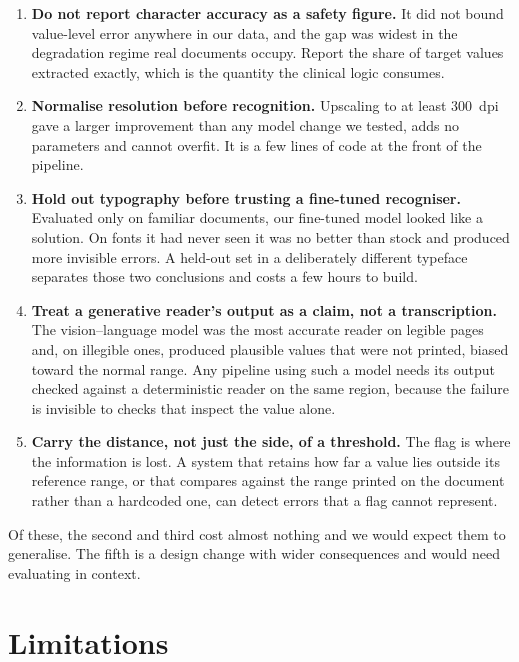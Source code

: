 \documentclass[11pt]{article}
\begin{document}
\begin{enumerate}
\item \textbf{Do not report character accuracy as a safety figure.} It did not bound value-level
error anywhere in our data, and the gap was widest in the degradation regime real documents
occupy. Report the share of target values extracted exactly, which is the quantity the clinical
logic consumes.

\item \textbf{Normalise resolution before recognition.} Upscaling to at least 300~dpi gave a
larger improvement than any model change we tested, adds no parameters and cannot overfit. It is
a few lines of code at the front of the pipeline.

\item \textbf{Hold out typography before trusting a fine-tuned recogniser.} Evaluated only on
familiar documents, our fine-tuned model looked like a solution. On fonts it had never seen it
was no better than stock and produced more invisible errors. A held-out set in a deliberately
different typeface separates those two conclusions and costs a few hours to build.

\item \textbf{Treat a generative reader's output as a claim, not a transcription.} The
vision--language model was the most accurate reader on legible pages and, on illegible ones,
produced plausible values that were not printed, biased toward the normal range. Any pipeline
using such a model needs its output checked against a deterministic reader on the same region,
because the failure is invisible to checks that inspect the value alone.

\item \textbf{Carry the distance, not just the side, of a threshold.} The flag is where the
information is lost. A system that retains how far a value lies outside its reference range, or
that compares against the range printed on the document rather than a hardcoded one, can detect
errors that a flag cannot represent.
\end{enumerate}

Of these, the second and third cost almost nothing and we would expect them to generalise. The
fifth is a design change with wider consequences and would need evaluating in context.

\section{Limitations}
\end{document}
